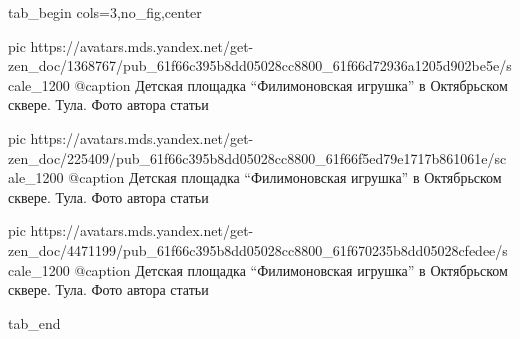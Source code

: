  
 
 
 
 


\ifcmt
  tab_begin cols=3,no_fig,center

     pic https://avatars.mds.yandex.net/get-zen_doc/1368767/pub_61f66c395b8dd05028cc8800_61f66d72936a1205d902be5e/scale_1200
		 @caption Детская площадка \enquote{Филимоновская игрушка} в Октябрьском сквере. Тула. Фото автора статьи

		 pic https://avatars.mds.yandex.net/get-zen_doc/225409/pub_61f66c395b8dd05028cc8800_61f66f5ed79e1717b861061e/scale_1200
		 @caption Детская площадка \enquote{Филимоновская игрушка} в Октябрьском сквере. Тула. Фото автора статьи

		 pic https://avatars.mds.yandex.net/get-zen_doc/4471199/pub_61f66c395b8dd05028cc8800_61f670235b8dd05028cfedee/scale_1200
		 @caption Детская площадка \enquote{Филимоновская игрушка} в Октябрьском сквере. Тула. Фото автора статьи

  tab_end
\fi
